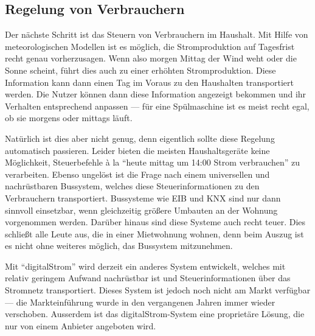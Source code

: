 \documentclass[12pt,BCOR=8.5mm]{scrartcl}
\begin{document}
\subsection{Regelung von Verbrauchern}\label{sub:steuern}

Der nächste Schritt ist das Steuern von Verbrauchern im Haushalt.
Mit Hilfe von meteorologischen Modellen ist es möglich, die
Stromproduktion auf Tagesfrist recht genau vorherzusagen. Wenn also
morgen Mittag der Wind weht oder die Sonne scheint, führt dies auch zu
einer erhöhten Stromproduktion. Diese Information kann dann einen Tag im
Voraus zu den Haushalten transportiert werden. Die Nutzer können dann
diese Information angezeigt bekommen und ihr Verhalten entsprechend
anpassen --- für eine Spülmaschine ist es meist recht egal, ob sie
morgens oder mittags läuft.

Natürlich ist dies aber nicht genug, denn eigentlich sollte diese
Regelung automatisch passieren. Leider bieten die meisten
Haushaltsgeräte keine Möglichkeit, Steuerbefehle à la "`heute mittag um
14:00 Strom verbrauchen"' zu verarbeiten. Ebenso ungelöst ist die Frage
nach einem universellen und nachrüstbaren Bussystem, welches diese
Steuerinformationen zu den Verbrauchern transportiert. Bussysteme wie
EIB und KNX sind nur dann sinnvoll einsetzbar, wenn gleichzeitig größere
Umbauten an der Wohnung vorgenommen werden. Darüber hinaus sind diese
Systeme auch recht teuer. Dies schließt alle Leute aus, die in einer
Mietwohnung wohnen, denn beim Auszug ist es nicht ohne weiteres
möglich, das Bussystem mitzunehmen.

Mit "`digitalStrom"' wird derzeit ein anderes System entwickelt, welches
mit relativ geringem Aufwand nachrüstbar ist und Steuerinformationen
über das Stromnetz transportiert. Dieses System ist jedoch noch nicht am
Markt verfügbar --- die Markteinführung wurde in den vergangenen Jahren
immer wieder verschoben. Ausserdem ist das digitalStrom-System eine
proprietäre Lösung, die nur von einem Anbieter angeboten wird. 
\end{document}
